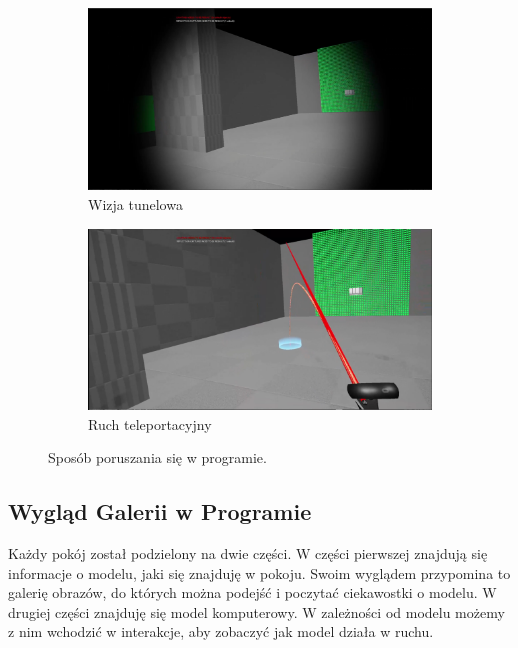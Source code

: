 \documentclass[a4paper,12pt,reqno]{article}
\begin{document}
\begin{figure}[!ht]%
	\centering
	\begin{subfigure}{.8\textwidth}
		\centering
		\includegraphics[width=0.8\linewidth]{graphics/tunnelvisionUE4.png}
		\caption{Wizja tunelowa}	
		\label{ref:subref_a}
	\end{subfigure}%

	\begin{subfigure}{.8\textwidth}
		\centering
		\includegraphics[width=0.8\linewidth]{graphics/teleportmoveUE4.png}
		\caption{Ruch teleportacyjny}	
		\label{ref:subref_c}
	\end{subfigure}%

\caption{Sposób poruszania się w programie.}
\label{ref:ref}
\end{figure}



\newpage
\subsection{Wygląd Galerii w Programie}

Każdy pokój został podzielony na dwie części. W części pierwszej znajdują się informacje o modelu, jaki się znajduję w pokoju. Swoim wyglądem przypomina to galerię obrazów, do których można podejść i poczytać ciekawostki o modelu. W drugiej części znajduję się model komputerowy. W zależności od modelu możemy z nim wchodzić w interakcje, aby zobaczyć jak model działa w ruchu.
\end{document}
